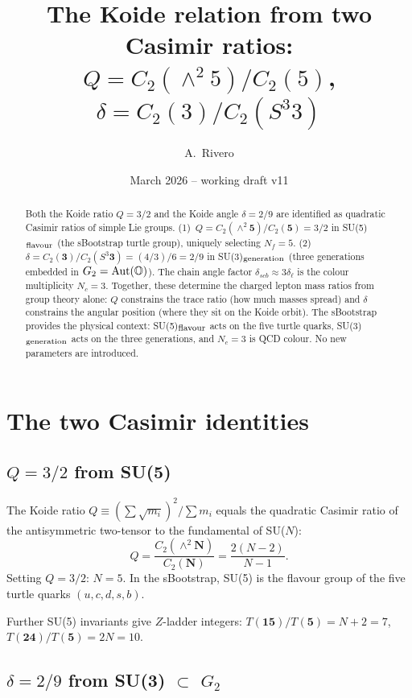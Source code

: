 \documentclass[11pt]{article}
\title{The Koide relation from two Casimir ratios:\\
  $Q = C_2(\wedge^2\!5)/C_2(5)$, $\delta = C_2(3)/C_2(S^3\!3)$}
\author{A.~Rivero}
\date{March 2026 -- working draft v11}
\begin{document}
\maketitle

\begin{abstract}
Both the Koide ratio $Q=3/2$ and the Koide angle
$\delta=2/9$ are identified as quadratic Casimir ratios
of simple Lie groups.
(1)~$Q = C_2(\wedge^2\mathbf{5})/C_2(\mathbf{5}) = 3/2$
in SU(5)$_{\rm flavour}$ (the sBootstrap turtle group),
uniquely selecting $N_f=5$.
(2)~$\delta = C_2(\mathbf{3})/C_2(S^3\mathbf{3}) = (4/3)/6 = 2/9$
in SU(3)$_{\rm generation}$ (three generations embedded in
$G_2 = {\rm Aut}(\mathbb{O})$).
The chain angle factor $\delta_{scb} \approx 3\delta_\ell$
is the colour multiplicity $N_c=3$.
Together, these determine the charged lepton mass ratios
from group theory alone: $Q$ constrains the trace ratio
(how much masses spread) and $\delta$ constrains the angular
position (where they sit on the Koide orbit).
The sBootstrap provides the physical context: SU(5)$_{\rm flavour}$
acts on the five turtle quarks, SU(3)$_{\rm generation}$ acts
on the three generations, and $N_c=3$ is QCD colour.
No new parameters are introduced.
\end{abstract}

\section{The two Casimir identities}

\subsection{$Q = 3/2$ from SU(5)}

The Koide ratio $Q \equiv (\sum\sqrt{m_i})^2/\sum m_i$ equals
the quadratic Casimir ratio of the antisymmetric two-tensor
to the fundamental of SU($N$):
\begin{equation}
  Q = \frac{C_2(\wedge^2\mathbf{N})}{C_2(\mathbf{N})}
  = \frac{2(N-2)}{N-1}.
\end{equation}
Setting $Q = 3/2$: $N = 5$.  In the sBootstrap, SU(5) is the
flavour group of the five turtle quarks $(u,c,d,s,b)$.

Further SU(5) invariants give $Z$-ladder integers:
$T(\mathbf{15})/T(\mathbf{5}) = N+2 = 7$,\;
$T(\mathbf{24})/T(\mathbf{5}) = 2N = 10$.

\subsection{$\delta = 2/9$ from SU(3) $\subset$ $G_2$}
\end{document}
